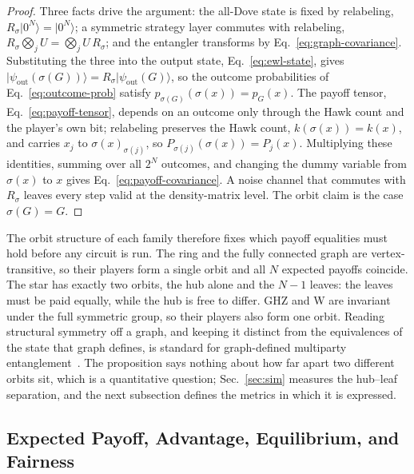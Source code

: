 \documentclass[conference,letterpaper,10pt]{IEEEtran}
\newcommand{\ket}[1]{\ensuremath{|#1\rangle}}
\begin{document}
\begin{proof}
Three facts drive the argument: the all-Dove state is fixed by relabeling,
$R_\sigma\ket{0^N}=\ket{0^N}$; a symmetric strategy layer commutes with
relabeling, $R_\sigma\bigotimes\nolimits_{j}U=\bigotimes\nolimits_{j}U\,R_\sigma$;
and the
entangler transforms by Eq.~\eqref{eq:graph-covariance}. Substituting the three
into the output state, Eq.~\eqref{eq:ewl-state}, gives
$\ket{\psi_{\mathrm{out}}(\sigma(G))}=R_\sigma\ket{\psi_{\mathrm{out}}(G)}$, so
the outcome probabilities of Eq.~\eqref{eq:outcome-prob} satisfy
$p_{\sigma(G)}(\sigma(x))=p_G(x)$. The payoff tensor,
Eq.~\eqref{eq:payoff-tensor}, depends on an outcome only through the Hawk count
and the player's own bit; relabeling preserves the Hawk count,
$k(\sigma(x))=k(x)$, and carries $x_j$ to $\sigma(x)_{\sigma(j)}$, so
$P_{\sigma(j)}(\sigma(x))=P_j(x)$. Multiplying these identities, summing over
all $2^N$ outcomes, and changing the dummy variable from $\sigma(x)$ to $x$
gives Eq.~\eqref{eq:payoff-covariance}. A noise channel that commutes with
$R_\sigma$ leaves every step valid at the density-matrix level. The orbit claim
is the case $\sigma(G)=G$.
\end{proof}

The orbit structure of each family therefore fixes which payoff equalities must
hold before any circuit is run. The ring and the fully connected graph are
vertex-transitive, so their players form a single orbit and all $N$ expected
payoffs coincide. The star has exactly two orbits, the hub alone and the $N-1$
leaves: the leaves must be paid equally, while the hub is free to differ.
GHZ and W are invariant under the full symmetric group, so their players
also form one orbit. Reading structural symmetry off a graph, and keeping it
distinct from the equivalences of the state that graph defines, is standard for
graph-defined multiparty entanglement~\cite{hein2004multiparty}. The proposition
says nothing about how far apart two different orbits sit, which is a
quantitative question; Sec.~\ref{sec:sim} measures the hub--leaf separation, and
the next subsection defines the metrics in which it is expressed.

\subsection{Expected Payoff, Advantage, Equilibrium, and Fairness}
\label{sec:metrics}
\end{document}
